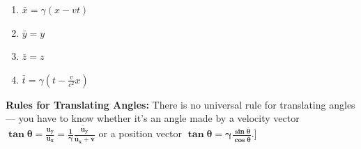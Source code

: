 \documentclass[11pt,letterpaper]{book}
\begin{document}
    \begin{enumerate}
        \item $\bar{x} = \gamma (x - vt)$
        \item $\bar{y} = y$
        \item $\bar{z} = z$
        \item $\bar{t} = \gamma \left( t - \frac{v}{c^2} x \right)$
    \end{enumerate}
    
    \textbf{Rules for Translating Angles:} There is no universal rule for translating angles — you have to know whether it’s an angle made by a velocity vector $\mathbf{\tan{\theta}=\frac{u_y}{u_x}=\frac{1}{\gamma}\frac{\bar{u}_y}{\bar{u}_x+v}}$ or a position vector $\mathbf{\tan{\theta}=\gamma\frac{\sin{\bar{\theta}}}{\cos{\bar{\theta}}}}$.]
    
\end{document}
